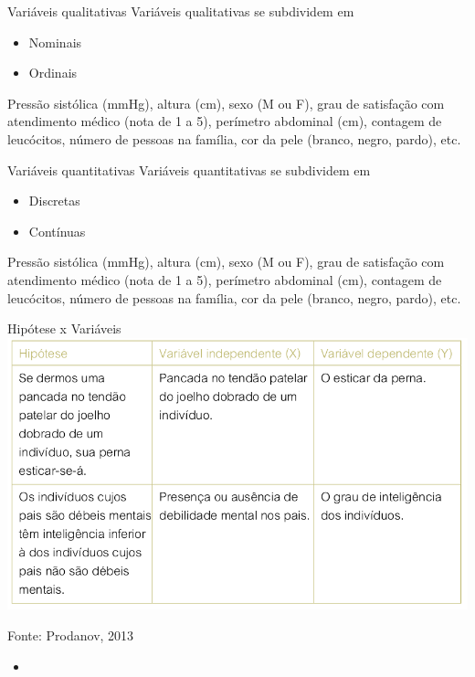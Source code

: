 \documentclass{beamer}
\begin{document}
\begin{frame}{Variáveis qualitativas}
Variáveis qualitativas se subdividem em
  \begin{itemize}
  \item<1-2> Nominais

  \item<3-4> Ordinais
  \end{itemize}


  \begin{example}
    Pressão sistólica (mmHg), altura (cm), \alert{sexo (M ou
      F)}, \alert{grau de satisfação com atendimento médico
      (nota de 1 a 5)}, perímetro abdominal (cm), contagem de
    leucócitos, número de pessoas na família, \alert{cor da
      pele (branco, negro, pardo)}, etc.
  \end{example}
\end{frame}

\begin{frame}{Variáveis quantitativas}
Variáveis quantitativas se subdividem em
  \begin{itemize}
  \item<1-2> Discretas
  \item<3-4> Contínuas
  \end{itemize}
  \begin{example}
    \alert{Pressão sistólica (mmHg)}, \alert{altura
      (cm)}, sexo (M ou F), grau de satisfação com atendimento médico
    (nota de 1 a 5), perímetro abdominal (cm), \alert{contagem
      de leucócitos}, \alert{número de pessoas na família},
    cor da pele (branco, negro, pardo), etc.
  \end{example}
\end{frame}

\begin{frame}{Hipótese x Variáveis}
  \includegraphics[height=0.8\textheight]{hipotese_variaveis}

  Fonte: Prodanov, 2013
\end{frame}

\begin{frame}{}
  \begin{itemize}
  \item 
  \end{itemize}
\end{frame}
\end{document}

